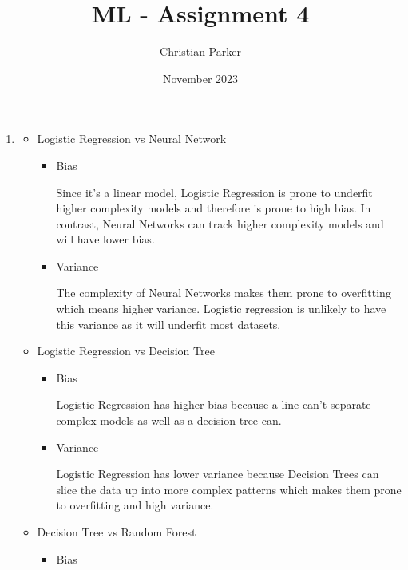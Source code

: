 \documentclass{article}
\title{ML - Assignment 4}
\author{Christian Parker}
\date{November 2023}
\begin{document}
    \maketitle
    \begin{enumerate}
        \item[1.]
            \begin{itemize}
                \item Logistic Regression vs Neural Network
                    \begin{itemize}
                        \item Bias
                        
                            Since it's a linear model, Logistic Regression is prone to underfit higher complexity models and therefore is prone to high bias. In contrast, Neural Networks can track higher complexity models and will have lower bias.
                        \item Variance
                        
                            The complexity of Neural Networks makes them prone to overfitting which means higher variance. Logistic regression is unlikely to have this variance as it will underfit most datasets.
                    \end{itemize}

                \item Logistic Regression vs Decision Tree
                    \begin{itemize}
                        \item Bias
                        
                            Logistic Regression has higher bias because a line can't separate complex models as well as a decision tree can.
                        \item Variance
                        
                            Logistic Regression has lower variance because Decision Trees can slice the data up into more complex patterns which makes them prone to overfitting and high variance.
                    \end{itemize}
                
                \item Decision Tree vs Random Forest
                    \begin{itemize}
                        \item Bias
                        

\end{itemize}
\end{itemize}
\end{enumerate}
\end{document}
